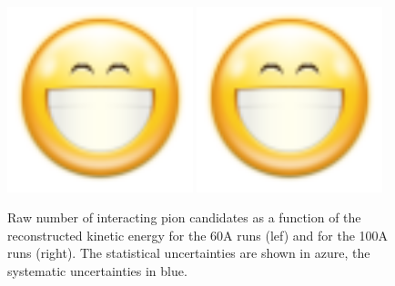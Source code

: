 \begin{figure}[p]
\centering  
\includegraphics[width=0.48\textwidth]{Chapter-4/Images/face-smile-big.png}
\includegraphics[width=0.48\textwidth]{Chapter-4/Images/face-smile-big.png}
\caption{Raw number of interacting pion candidates as a function of the reconstructed kinetic energy for the 60A runs (lef) and for the 100A runs (right). The statistical uncertainties are shown in azure, the systematic uncertainties in blue.}
\label{fig:InteractingRaw}
\end{figure}



